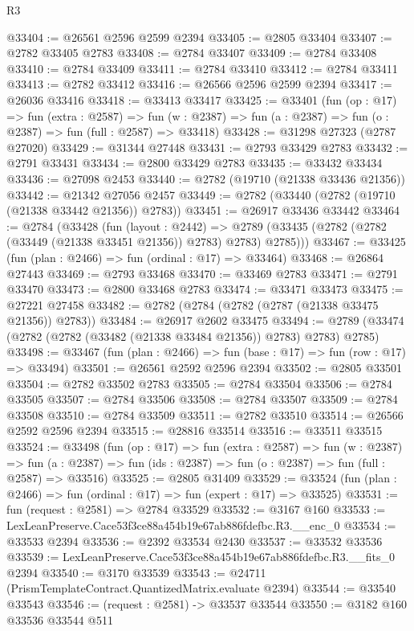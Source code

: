 \begin{lexlean}{R3}
\begin{coremodule}
@33404 := @26561 @2596 @2599 @2394
@33405 := @2805 @33404
@33407 := @2782 @33405 @2783
@33408 := @2784 @33407
@33409 := @2784 @33408
@33410 := @2784 @33409
@33411 := @2784 @33410
@33412 := @2784 @33411
@33413 := @2782 @33412
@33416 := @26566 @2596 @2599 @2394
@33417 := @26036 @33416
@33418 := @33413 @33417
@33425 := @33401
    (fun (op : @17) =>
    fun (extra : @2587) =>
    fun (w : @2387) => fun (a : @2387) => fun (o : @2387) => fun (full : @2587) => @33418)
@33428 := @31298 @27323 (@2787 @27020)
@33429 := @31344 @27448
@33431 := @2793 @33429 @2783
@33432 := @2791 @33431
@33434 := @2800 @33429 @2783
@33435 := @33432 @33434
@33436 := @27098 @2453
@33440 := @2782 (@19710 (@21338 @33436 @21356))
@33442 := @21342 @27056 @2457
@33449 := @2782 (@33440 (@2782 (@19710 (@21338 @33442 @21356)) @2783))
@33451 := @26917 @33436 @33442
@33464 := @2784
    (@33428
      (fun (layout : @2442) =>
      @2789 (@33435 (@2782 (@2782 (@33449 (@21338 @33451 @21356)) @2783) @2783) @2785)))
@33467 := @33425 (fun (plan : @2466) => fun (ordinal : @17) => @33464)
@33468 := @26864 @27443
@33469 := @2793 @33468
@33470 := @33469 @2783
@33471 := @2791 @33470
@33473 := @2800 @33468 @2783
@33474 := @33471 @33473
@33475 := @27221 @27458
@33482 := @2782 (@2784 (@2782 (@2787 (@21338 @33475 @21356)) @2783))
@33484 := @26917 @2602 @33475
@33494 := @2789 (@33474 (@2782 (@2782 (@33482 (@21338 @33484 @21356)) @2783) @2783) @2785)
@33498 := @33467 (fun (plan : @2466) => fun (base : @17) => fun (row : @17) => @33494)
@33501 := @26561 @2592 @2596 @2394
@33502 := @2805 @33501
@33504 := @2782 @33502 @2783
@33505 := @2784 @33504
@33506 := @2784 @33505
@33507 := @2784 @33506
@33508 := @2784 @33507
@33509 := @2784 @33508
@33510 := @2784 @33509
@33511 := @2782 @33510
@33514 := @26566 @2592 @2596 @2394
@33515 := @28816 @33514
@33516 := @33511 @33515
@33524 := @33498
    (fun (op : @17) =>
    fun (extra : @2587) =>
    fun (w : @2387) =>
    fun (a : @2387) => fun (ids : @2387) => fun (o : @2387) => fun (full : @2587) => @33516)
@33525 := @2805 @31409
@33529 := @33524 (fun (plan : @2466) => fun (ordinal : @17) => fun (expert : @17) => @33525)
@33531 := fun (request : @2581) => @2784 @33529
@33532 := @3167 @160
@33533 := LexLeanPreserve.Cace53f3ce88a454b19e67ab886fdefbc.R3.__enc_0
@33534 := @33533 @2394
@33536 := @2392 @33534 @2430
@33537 := @33532 @33536
@33539 := LexLeanPreserve.Cace53f3ce88a454b19e67ab886fdefbc.R3.__fits_0 @2394
@33540 := @3170 @33539
@33543 := @24711 (PrismTemplateContract.QuantizedMatrix.evaluate @2394)
@33544 := @33540 @33543
@33546 := (request : @2581) -> @33537 @33544
@33550 := @3182 @160 @33536 @33544 @511

\end{coremodule}
\end{lexlean}
